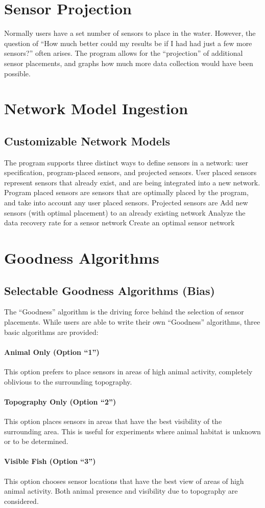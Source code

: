 \section{Sensor Projection}
Normally users have a set number of sensors to place in the water.  However, the question of “How much better could my results be if I had had just a few more sensors?” often arises.   The program allows for the “projection” of additional sensor placements, and graphs how much more data collection would have been possible.

\section{Network Model Ingestion}
\subsection{Customizable Network Models}
The program supports three distinct ways to define sensors in a network: 
user specification, program-placed sensors, and projected sensors. 
User placed sensors represent sensors that already exist, and are being integrated into a new network.
Program placed sensors are sensors that are optimally placed by the program, and take into account any user placed sensors.
Projected sensors are 
Add new sensors (with optimal placement) to an already existing network
Analyze the data recovery rate for a sensor network
Create an optimal sensor network

\section{Goodness Algorithms}
\subsection{Selectable Goodness Algorithms (Bias)}
The “Goodness” algorithm is the driving force behind the selection of sensor placements.  While users are able to write their own “Goodness” algorithms, three basic algorithms are provided: 

\paragraph{Animal Only (Option “1”)}
This option prefers to place sensors in areas of high animal activity, completely oblivious to the surrounding topography.  

\paragraph{Topography Only (Option “2”)}
This option places sensors in areas that have the best visibility of the surrounding area.  This is useful for experiments where animal habitat is unknown or to be determined.

\paragraph{Visible Fish (Option “3”)}
This option chooses sensor locations that have the best view of areas of high animal activity.  Both animal presence and visibility due to topography are considered.
